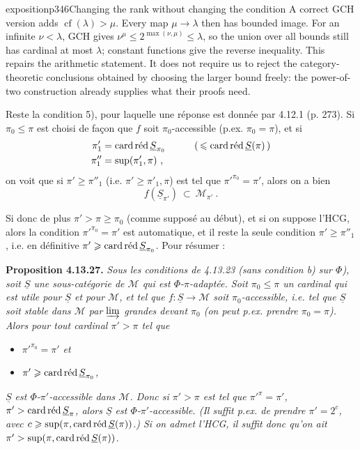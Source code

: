 \begin{dcomment}{exposition}{p346}{Changing the rank without changing the condition}
A correct GCH version adds $\operatorname{cf}(\lambda)>\mu$. Every map $\mu\to\lambda$ then has bounded image. For an infinite $\nu<\lambda$, GCH gives $\nu^\mu\leq 2^{\max(\nu,\mu)}\leq\lambda$, so the union over all bounds still has cardinal at most $\lambda$; constant functions give the reverse inequality. This repairs the arithmetic statement. It does not require us to reject the category-theoretic conclusions obtained by choosing the larger bound freely: the power-of-two construction already supplies what their proofs need.
\end{dcomment}


Reste la condition 5), pour laquelle une réponse est donnée par 4.12.1 (p. 273). Si $\pi_0\leqslant\pi$ est choisi de façon que $f$ soit $\pi_0$-accessible (p.ex. $\pi_0=\pi$), et si
\[
\begin{aligned}
\pi'_1 &= \cardred\underline{S}_{\pi_0} \qquad\quad (\,\leqslant\cardred\underline{S}(\pi)\,)\\
\pi''_1 &= \sup(\pi'_1,\pi)\ ,
\end{aligned}
\]
on voit que si $\pi'\geqslant\pi''_1$ (i.e. $\pi'\geqslant\pi'_1,\pi$) est tel que $\pi'^{\pi_0}=\pi'$, alors on a bien
\[ f(\underline{S}_{\pi'})\ \subset\ \mathcal{M}_{\pi'}\ . \]

Si donc de plus $\pi'>\pi\geqslant\pi_0$ (comme supposé au début), et si on suppose l'HCG, alors la condition $\pi'^{\pi_0}=\pi'$ est automatique, et il reste la seule condition $\pi'\geqslant\pi''_1$, i.e. en définitive $\pi'\geqslant\cardred\underline{S}_{\pi_0}$. Pour résumer :

\textbf{Proposition 4.13.27.} \textit{Sous les conditions de 4.13.23 (sans condition b) sur $\Phi$), soit $\underline{S}$ une sous-catégorie de $\mathcal{M}$ qui est $\Phi$-$\pi$-adaptée. Soit $\pi_0\leqslant\pi$ un cardinal qui est utile pour $\underline{S}$ et pour $\mathcal{M}$, et tel que $f:\underline{S}\longrightarrow\mathcal{M}$ soit $\pi_0$-accessible, i.e. tel que $\underline{S}$ soit stable dans $\mathcal{M}$ par $\varinjlim$ grandes devant $\pi_0$ (on peut p.ex. prendre $\pi_0=\pi$). Alors pour tout cardinal $\pi'>\pi$ tel que}
\begin{itemize}[leftmargin=2.5em]
\item[\textit{a)}] \textit{$\pi'^{\pi_0}=\pi'$ et}
\item[\textit{b)}] \textit{$\pi'\geqslant\cardred\underline{S}_{\pi_0}$,}
\end{itemize}
\textit{$\underline{S}$ est $\Phi$-$\pi'$-accessible dans $\mathcal{M}$. Donc si $\pi'>\pi$ est tel que $\pi'^{\pi}=\pi'$, $\pi'>\cardred\underline{S}_\pi$, alors $\underline{S}$ est $\Phi$-$\pi'$-accessible. (Il suffit p.ex. de prendre $\pi'=2^c$, avec $c\geqslant\sup(\pi,\cardred\underline{S}(\pi))$.) Si on admet l'HCG, il suffit donc qu'on ait $\pi'>\sup(\pi,\cardred\underline{S}(\pi))$.}

